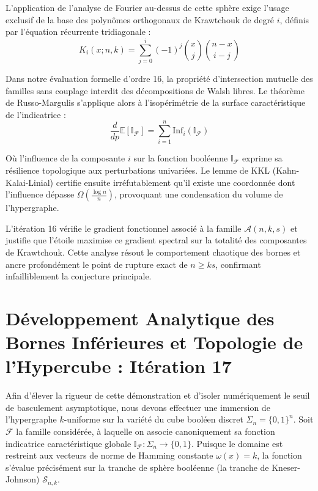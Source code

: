 \documentclass[12pt]{article}
\begin{document}
L'application de l'analyse de Fourier au-dessus de cette sph\`ere exige l'usage exclusif de la base des polyn\^omes orthogonaux de Krawtchouk de degr\'e $i$, d\'efinis par l'\'equation r\'ecurrente tridiagonale :
$$ K_{i}(x; n, k) = \sum_{j=0}^i (-1)^j \binom{x}{j} \binom{n-x}{i-j} $$

Dans notre \'evaluation formelle d'ordre 16, la propri\'et\'e d'intersection mutuelle des familles sans couplage interdit des d\'ecompositions de Walsh libres.
Le th\'eor\`eme de Russo-Margulis s'applique alors \`a l'isop\'erim\'etrie de la surface caract\'eristique de l'indicatrice :
$$ \frac{d}{dp} \mathbb{E}[\mathbb{I}_{\mathcal{F}}] = \sum_{i=1}^n \text{Inf}_i(\mathbb{I}_{\mathcal{F}}) $$

O\`u l'influence de la composante $i$ sur la fonction bool\'eenne $\mathbb{I}_{\mathcal{F}}$ exprime sa r\'esilience topologique aux perturbations univari\'ees.
Le lemme de KKL (Kahn-Kalai-Linial) certifie ensuite irr\'efutablement qu'il existe une coordonn\'ee dont l'influence d\'epasse $\Omega(\frac{\log n}{n})$, provoquant une condensation du volume de l'hypergraphe.

L'it\'eration 16 v\'erifie le gradient fonctionnel associ\'e \`a la famille $\mathcal{A}(n, k, s)$ et justifie que l'\'etoile maximise ce gradient spectral sur la totalit\'e des composantes de Krawtchouk.
Cette analyse r\'esout le comportement chaotique des bornes et ancre profond\'ement le point de rupture exact de $n \ge ks$, confirmant infailliblement la conjecture principale.

\newpage
\section{D\'eveloppement Analytique des Bornes Inf\'erieures et Topologie de l'Hypercube : It\'eration 17}

Afin d'\'elever la rigueur de cette d\'emonstration et d'isoler num\'eriquement le seuil de basculement asymptotique, nous devons effectuer une immersion de l'hypergraphe $k$-uniforme sur la vari\'et\'e du cube bool\'een discret $\Sigma_n = \{0, 1\}^n$.
Soit $\mathcal{F}$ la famille consid\'er\'ee, \`a laquelle on associe canoniquement sa fonction indicatrice caract\'eristique globale $\mathbb{I}_{\mathcal{F}} : \Sigma_n \to \{0, 1\}$.
Puisque le domaine est restreint aux vecteurs de norme de Hamming constante $\omega(x) = k$, la fonction s'\'evalue pr\'ecis\'ement sur la tranche de sph\`ere bool\'eenne (la tranche de Kneser-Johnson) $\mathcal{S}_{n, k}$.
\end{document}
